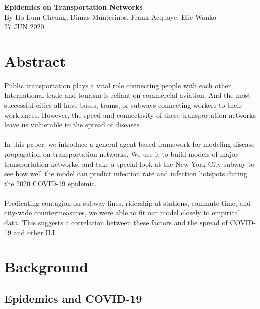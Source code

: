 \documentclass[12pt, a4, epsf] {article}
\theoremstyle{plain}
\theoremstyle{definition}
\begin{document}
\begin{center}

{\Large \textbf{Epidemics on Transportation Networks}\\}
By Ho Lum Cheung, Dimas Muntesinos, Frank Acquaye, Elie Wanko \\
27 JUN 2020
\end{center}

\section*{Abstract}
\paragraph{}
Public transportation plays a vital role connecting people with each other. International trade and tourism is reliant on commercial aviation. And the most successful cities all have buses, trams, or subways connecting workers to their workplaces. However, the speed and connectivity of these transportation networks leave us vulnerable to the spread of diseases.\\
\paragraph{}
In this paper, we introduce a general agent-based framework for modeling disease propagation on transportation networks. We use it to build models of major transportation networks, and take a special look at the New York City subway to see how well the model can predict infection rate and infection hotspots during the 2020 COVID-19 epidemic.\\
\paragraph{}
Predicating contagion on subway lines, ridership at stations, commute time, and city-wide countermeasures, we were able to fit our model closely to empirical data. This suggests a correlation between these factors and the spread of COVID-19 and other ILI.

\section{Background}
\subsection{Epidemics and COVID-19}
\end{document}
